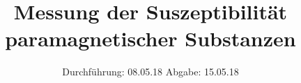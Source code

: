 

\subject{V606}
\title{Messung der Suszeptibilität paramagnetischer Substanzen}
\date{%
  Durchführung: 08.05.18
  \hspace{3em}
  Abgabe: 15.05.18
}



\maketitle
\thispagestyle{empty}
\tableofcontents
\newpage






\printbibliography{}


